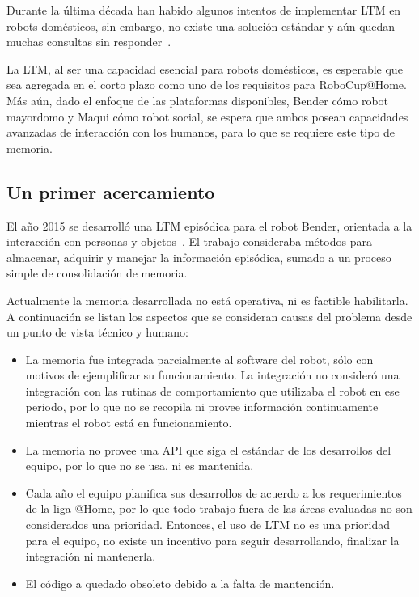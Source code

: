Durante la última década han habido algunos intentos de implementar LTM en robots domésticos, sin embargo, no existe una solución estándar y aún quedan muchas consultas sin responder~\cite{ltm_in_robocup}.

La LTM, al ser una capacidad esencial para robots domésticos, es esperable que sea agregada en el corto plazo como uno de los requisitos para RoboCup@Home. Más aún, dado el enfoque de las plataformas disponibles, Bender cómo robot mayordomo y Maqui cómo robot social, se espera que ambos posean capacidades avanzadas de interacción con los humanos, para lo que se requiere este tipo de memoria.


\subsection{Un primer acercamiento}\label{sec:primer_acercamiento}

El año 2015 se desarrolló una LTM episódica para el robot Bender, orientada a la interacción con personas y objetos~\cite{Sanchez:2015}. El trabajo consideraba métodos para almacenar, adquirir y manejar la información episódica, sumado a un proceso simple de consolidación de memoria.

Actualmente la memoria desarrollada no está operativa, ni es factible habilitarla. A continuación se listan los aspectos que se consideran causas del problema desde un punto de vista técnico y humano:
\begin{itemize}
	\item La memoria fue integrada parcialmente al software del robot, sólo con motivos de ejemplificar su funcionamiento. La integración no consideró una integración con las rutinas de comportamiento que utilizaba el robot en ese periodo, por lo que no se recopila ni provee información continuamente mientras el robot está en funcionamiento.
	\item La memoria no provee una API que siga el estándar de los desarrollos del equipo, por lo que no se usa, ni es mantenida.
	\item Cada año el equipo planifica sus desarrollos de acuerdo a los requerimientos de la liga @Home, por lo que todo trabajo fuera de las áreas evaluadas no son considerados una prioridad. Entonces, el uso de LTM no es una prioridad para el equipo, no existe un incentivo para seguir desarrollando, finalizar la integración ni mantenerla. 
	\item El código a quedado obsoleto debido a la falta de mantención.
\end{itemize}

